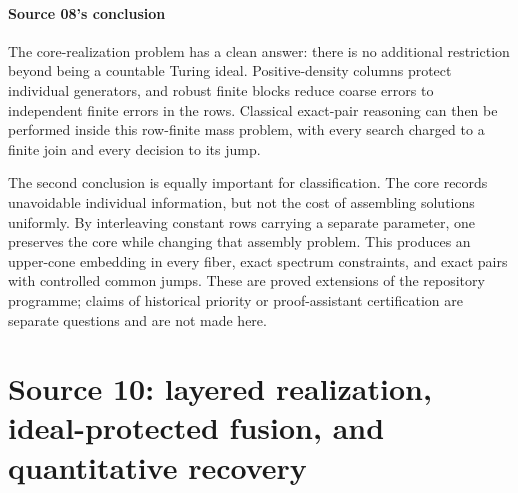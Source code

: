 \documentclass[11pt,letterpaper]{article}
\theoremstyle{plain}
\theoremstyle{definition}
\theoremstyle{remark}
\numberwithin{equation}{section}
\begin{document}
\subsection{Source 08's conclusion}\label{cr12:ep:sec:conclusion}
The core-realization problem has a clean answer: there is no additional restriction
beyond being a countable Turing ideal. Positive-density columns protect individual
generators, and robust finite blocks reduce coarse errors to independent finite
errors in the rows. Classical exact-pair reasoning can then be performed inside this
row-finite mass problem, with every search charged to a finite join and every
decision to its jump.

The second conclusion is equally important for classification. The core records
unavoidable individual information, but not the cost of assembling solutions
uniformly. By interleaving constant rows carrying a separate parameter, one preserves
the core while changing that assembly problem. This produces an upper-cone embedding
in every fiber, exact spectrum constraints, and exact pairs with controlled common
jumps. These are proved extensions of the repository programme; claims of historical
priority or proof-assistant certification are separate questions and are not made
here.

\clearpage
\part{Source 10: layered realization, ideal-protected fusion, and quantitative recovery}\label{cr12:part3}
\end{document}
